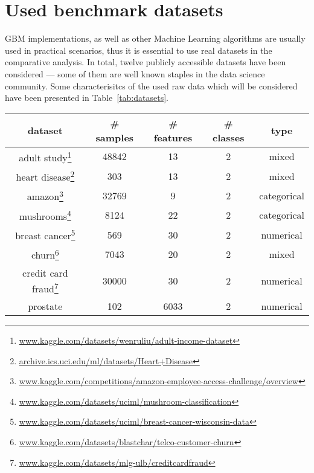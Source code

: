 \documentclass[magisterska, english]{pwr_wmat_praca_dyplomowa}
\theoremstyle{plain}
\numberwithin{theorem}{chapter}
\theoremstyle{definition}
\numberwithin{theorem}{chapter}
\begin{document}
\section{Used benchmark datasets}\label{section:real_datasets}
GBM implementations, as well as other Machine Learning algorithms are usually used in practical scenarios, thus it is essential to use real datasets in the comparative analysis. In total, twelve publicly accessible datasets have been considered --- some of them are well known staples in the data science community. Some characterisitcs of the used raw data which will be considered have been presented in Table~\ref{tab:datasets}.
\newpage
\begin{table}[h!] %
\centering
\begin{tabular}{|c|c|c|c|c|}
\hline
\textbf{dataset}  & \textbf{\# samples} & \textbf{\# features} & \textbf{\# classes} & \textbf{type} \\ \hline
adult study\footnote{\url{www.kaggle.com/datasets/wenruliu/adult-income-dataset}}       & 48842              & 13                  & 2                  & mixed         \\ \hline
heart disease\footnote{\url{archive.ics.uci.edu/ml/datasets/Heart+Disease}}     & 303                & 13                  & 2                  & mixed         \\ \hline
amazon\footnote{\url{www.kaggle.com/competitions/amazon-employee-access-challenge/overview}}            & 32769              & 9                   & 2                  & categorical   \\ \hline
mushrooms\footnote{\url{www.kaggle.com/datasets/uciml/mushroom-classification}}           & 8124               & 22                  & 2                  & categorical   \\ \hline
breast cancer\footnote{\url{www.kaggle.com/datasets/uciml/breast-cancer-wisconsin-data}}     & 569                & 30                  & 2                  & numerical     \\ \hline
churn\footnote{\url{www.kaggle.com/datasets/blastchar/telco-customer-churn}}             & 7043               & 20                  & 2                  & mixed         \\ \hline
credit card fraud\footnote{\url{www.kaggle.com/datasets/mlg-ulb/creditcardfraud}} & 30000              & 30                  & 2                  & numerical     \\ \hline
prostate \cite{microrray_data}        & 102                & 6033                & 2                  & numerical     \\ \hline

\end{tabular}
\end{table}
\end{document}
